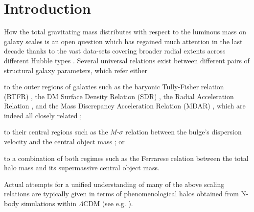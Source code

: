 \section{Introduction}

How the total gravitating mass distributes with respect to the luminous mass on galaxy scales is an open question which has regained much attention in the last decade thanks to the vast data-sets covering broader radial extents across different Hubble types \citep{2008AJ....136.2648D,2011MNRAS.413..813C,2016AJ....152..157L}.
Several universal relations exist between different pairs of structural galaxy parameters, which refer either \begin{inparaenum}[(i)]
    \item to the outer regions of galaxies such as the baryonic Tully-Fisher relation (BTFR) \citep{2000ApJ...533L..99M}, the DM Surface Density Relation (SDR) \citep{2009MNRAS.397.1169D}, the Radial Acceleration Relation \citep{2016PhRvL.117t1101M}, and the Mass Discrepancy Acceleration Relation (MDAR) \citep{2004ApJ...609..652M}, which are indeed all closely related \citep{2004ApJ...609..652M,2016arXiv161208857S,2018FoPh...48.1517S}; 
    \item to their central regions such as the $M$-$\sigma$ relation between the bulge's dispersion velocity and the central object mass \citep{2000ApJ...539L...9F}; or
    \item to a combination of both regimes such as the Ferrarese relation \citep{2002ApJ...578...90F,2011Natur.469..377K,2015ApJ...800..124B} between the total halo mass and its supermassive central object mass.
\end{inparaenum}

Actual attempts for a unified understanding of many of the above scaling relations are typically given in terms of phenomenological halos obtained from N-body simulations within $\Lambda$CDM (see e.g. \citealp{2017MNRAS.471.1841N,2017PhRvL.118p1103L,2017MNRAS.464.2419S,2018FoPh...48.1517S}).

